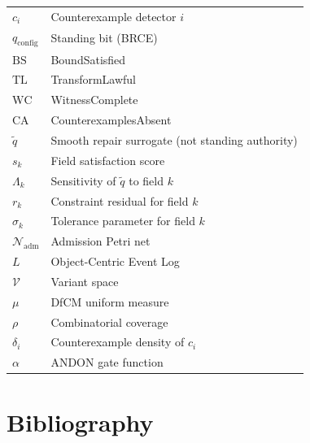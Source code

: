 \documentclass[12pt, letterpaper]{report}
\theoremstyle{plain}
\theoremstyle{definition}
\theoremstyle{remark}
\newcommand{\NN}{\mathcal{N}}
\newcommand{\VV}{\mathcal{V}}
\newcommand{\qc}{q_{\mathrm{config}}}
\begin{document}
\begin{longtable}{@{}lp{10cm}@{}}
$c_i$ & Counterexample detector $i$ \\
$\qc$ & Standing bit (BRCE) \\
$\mathrm{BS}$ & BoundSatisfied \\
$\mathrm{TL}$ & TransformLawful \\
$\mathrm{WC}$ & WitnessComplete \\
$\mathrm{CA}$ & CounterexamplesAbsent \\
$\tilde{q}$ & Smooth repair surrogate (not standing authority) \\
$s_k$ & Field satisfaction score \\
$\Lambda_k$ & Sensitivity of $\tilde{q}$ to field $k$ \\
$r_k$ & Constraint residual for field $k$ \\
$\sigma_k$ & Tolerance parameter for field $k$ \\
$\NN_{\mathrm{adm}}$ & Admission Petri net \\
$L$ & Object-Centric Event Log \\
$\VV$ & Variant space \\
$\mu$ & DfCM uniform measure \\
$\rho$ & Combinatorial coverage \\
$\delta_i$ & Counterexample density of $c_i$ \\
$\alpha$ & ANDON gate function \\
\bottomrule
\end{longtable}

\chapter*{Bibliography}
\end{document}
